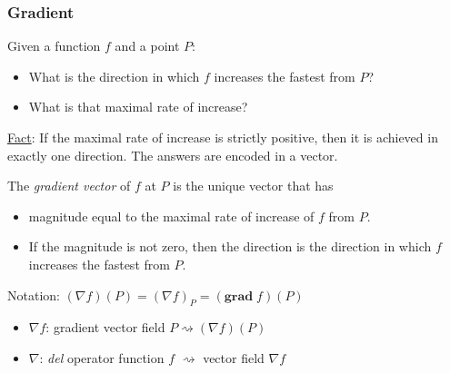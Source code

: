 \begin{frame}
  \frametitle{Gradient}
  Given a function $f$ and a point $P$:
\begin{itemize}
  \item What is the direction in which $f$ increases the fastest from $P$?
  \item What is that maximal rate of increase?
\end{itemize}
%
\pause
\underline{Fact}: If the maximal rate of increase is strictly positive, then it is achieved in exactly one direction. \pause The answers are encoded in a vector.

\begin{definition}
   The \emph{gradient vector} of $f$ at $P$ is the unique vector that has
\begin{itemize}
  \item magnitude equal to the maximal rate of increase of $f$ from $P$.
  \item If the magnitude is not zero, then the direction is the direction in which $f$ increases the fastest from $P$.
\end{itemize}
\end{definition}
%
Notation: $(\nabla f)(P) = (\nabla f)_P = (\textbf{grad} \;f)(P)$

\begin{itemize}
  \item $\nabla f$: gradient vector field \hspace{2cm}
$P \rightsquigarrow (\nabla f)(P)$
%
\item $\nabla$: \emph{del} operator \hspace{2cm}
function $f$ $\rightsquigarrow$ vector field $\nabla f$
\end{itemize}

\end{frame}

